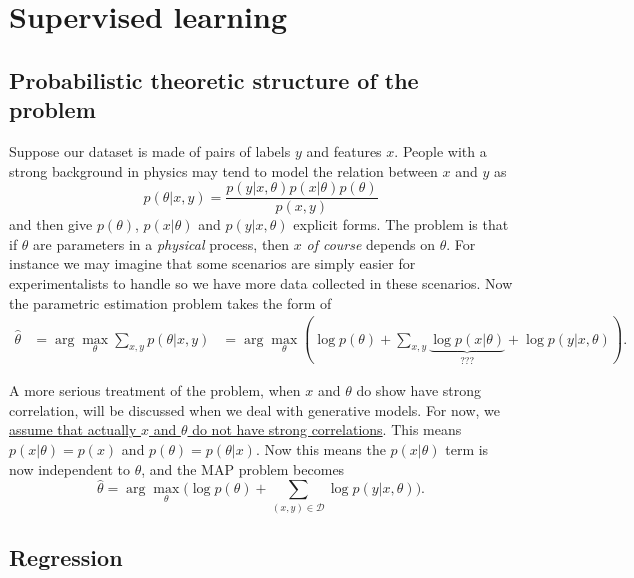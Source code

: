 \documentclass[hyperref, a4paper, 12pt]{report}
\newcommand*{\argmax}{\arg\max}
\def\\{}%
\begin{document}
\section{Supervised learning}

\subsection{Probabilistic theoretic structure of the problem}

Suppose our dataset is made of pairs of labels $y$ and features $x$.
People with a strong background in physics may tend to model the relation between $x$ and $y$ as 
\begin{equation}
    p(\theta | x, y) = \frac{p(y | x, \theta) p(x | \theta) p(\theta)}{p(x, y)} 
\end{equation}
and then give $p(\theta)$, $p(x | \theta)$ and $p(y | x, \theta)$ explicit forms.
The problem is that if $\theta$ are parameters in a \emph{physical} process,
then $x$ \emph{of course} depends on $\theta$.
For instance we may imagine that some scenarios are simply easier for experimentalists to handle
so we have more data collected in these scenarios.
Now the parametric estimation problem takes the form of 
\begin{equation}
    \begin{aligned}
        \hat{\theta} &= \argmax_\theta \sum_{x, y} p(\theta | x, y) \\
        &= \argmax_\theta (\log p(\theta) + \sum_{x, y} \underbrace{\log p(x | \theta)}_{\text{???}} + \log p(y | x, \theta)) .
    \end{aligned}
\end{equation}

A more serious treatment of the problem, when $x$ and $\theta$ do show have strong correlation,
will be discussed when we deal with generative models.
For now, we \uline{assume that actually $x$ and $\theta$ do not have strong correlations}.
This means $p(x | \theta) = p(x)$ and $p(\theta) = p(\theta | x)$.
Now this means the $p(x | \theta)$ term is now independent to $\theta$, and the MAP problem becomes 
\begin{equation}
    \hat{\theta} = \argmax_\theta \big(\log p(\theta) + \sum_{(x, y) \in \mathcal{D}} \log p(y | x, \theta) \big).
    \label{eq:y-xtheta-no-generative}
\end{equation}

\subsection{Regression}
\end{document}
